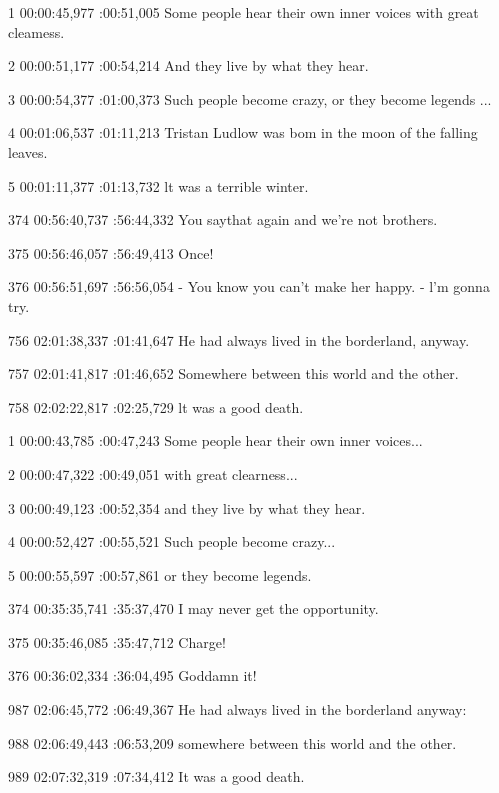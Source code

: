 \begin{subexam}
1
00:00:45,977 :00:51,005
Some people hear their own
inner voices with great cleamess.

2
00:00:51,177 :00:54,214
And they live by what they hear.

3
00:00:54,377 :01:00,373
Such people become crazy,
or they become legends ...

4
00:01:06,537 :01:11,213
Tristan Ludlow was bom
in the moon of the falling leaves.

5
00:01:11,377 :01:13,732
lt was a terrible winter.

374
00:56:40,737 :56:44,332
You saythat again
and we're not brothers.

375
00:56:46,057 :56:49,413
Once!

376
00:56:51,697 :56:56,054
- You know you can't make her happy.
- l'm gonna try.

756
02:01:38,337 :01:41,647
He had always lived
in the borderland, anyway.

757
02:01:41,817 :01:46,652
Somewhere between this world
and the other.

758
02:02:22,817 :02:25,729
lt was a good death.
\end{subexam}
\hspace{0.5cm}
\begin{subexam}
1
00:00:43,785 :00:47,243
Some people hear their own
inner voices...

2
00:00:47,322 :00:49,051
with great clearness...

3
00:00:49,123 :00:52,354
and they live
by what they hear.

4
00:00:52,427 :00:55,521
Such people become crazy...

5
00:00:55,597 :00:57,861
or they become legends.

374
00:35:35,741 :35:37,470
I may never get the opportunity.

375
00:35:46,085 :35:47,712
Charge!

376
00:36:02,334 :36:04,495
Goddamn it!

987
02:06:45,772 :06:49,367
He had always lived
in the borderland anyway:

988
02:06:49,443 :06:53,209
somewhere between this world
and the other.

989
02:07:32,319 :07:34,412
It was a good death.
\end{subexam}

